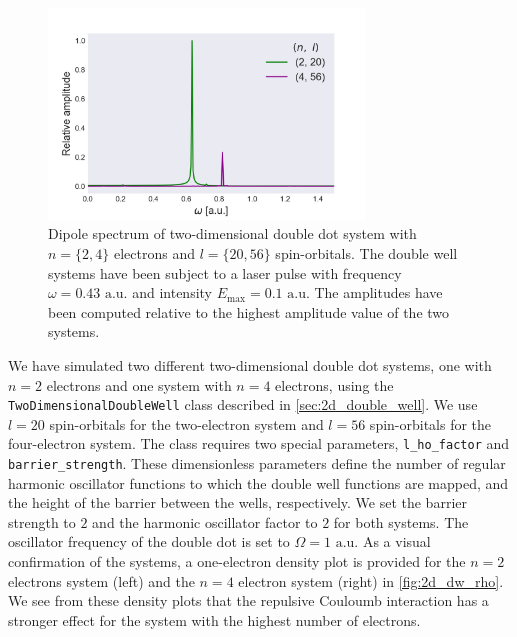 \begin{figure}
    \centering
    \includegraphics[width=0.75\textwidth]{results/figures/DW/dw_n2_n4_spectrum.png} 
    \caption{Dipole spectrum of two-dimensional double dot system with $n=\{2,4\}$
        electrons and $l=\{20, 56\}$ spin-orbitals. The double well systems have been 
        subject to a laser pulse with frequency $\omega = 0.43 \text{ a.u.}$ and intensity 
        $E_\text{max} = 0.1 \text{ a.u.}$ The amplitudes have been computed relative to 
        the highest amplitude value of the two systems.
    }
    \label{fig:2d_dw_n2_n4_spectra}
\end{figure}

We have simulated two different two-dimensional double dot systems, one with $n=2$ electrons 
and 
one system with $n=4$ electrons, using the \lstinline{TwoDimensionalDoubleWell} class described
in \autoref{sec:2d_double_well}. We use $l=20$ spin-orbitals for the two-electron system 
and $l=56$ spin-orbitals for the four-electron system. The class requires two special parameters, 
\lstinline{l_ho_factor} and \lstinline{barrier_strength}. These dimensionless parameters
define the number of regular harmonic oscillator functions to which the double well
functions are mapped, and the height of the 
barrier between the wells, respectively. We set the barrier strength to $2$ 
and the harmonic oscillator factor to $2$ for both systems. The oscillator frequency 
of the double dot is set to $\Omega=1 \text{ a.u.}$ As a visual confirmation of the systems, a 
one-electron density plot is provided for the $n=2$ electrons system (left) and 
the $n=4$ electron system (right) in \autoref{fig:2d_dw_rho}. We see from these density plots 
that the repulsive Couloumb interaction has a stronger effect for the system with the 
highest number of electrons.

